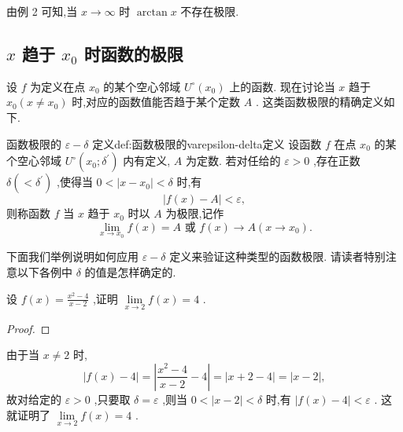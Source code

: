 \begin{remark}
由例 2 可知,当 \(x \rightarrow  \infty\) 时 \(\arctan x\) 不存在极限.
\end{remark}


\subsection{\(x\) 趋于 \({x}_{0}\) 时函数的极限}

设 \(f\) 为定义在点 \({x}_{0}\) 的某个空心邻域 \({U}^{ \circ  }\left( {x}_{0}\right)\) 上的函数. 现在讨论当 \(x\) 趋于 \({x}_{0}\left( {x \neq  {x}_{0}}\right)\) 时,对应的函数值能否趋于某个定数 \(A\) . 这类函数极限的精确定义如下.

\begin{definition}{函数极限的 \(\varepsilon  - \delta\) 定义}{def:函数极限的varepsilon-delta定义}
设函数 \(f\) 在点 \({x}_{0}\) 的某个空心邻域 \({U}^{ \circ  }\left( {{x}_{0};{\delta }^{\prime }}\right)\) 内有定义, \(A\) 为定数. 若对任给的 \(\varepsilon  > 0\) ,存在正数 \(\delta \left( { < {\delta }^{\prime }}\right)\) ,使得当 \(0 < \left| {x - {x}_{0}}\right|  < \delta\) 时,有
\[
\left| {f\left( x\right)  - A}\right|  < \varepsilon ,
\]
则称函数 \(f\) 当 \(x\) 趋于 \({x}_{0}\) 时以 \(A\) 为极限,记作
\[
\mathop{\lim }\limits_{{x \rightarrow  {x}_{0}}}f\left( x\right)  = A\text{ 或 }f\left( x\right)  \rightarrow  A\left( {x \rightarrow  {x}_{0}}\right) .
\]
\end{definition}

下面我们举例说明如何应用 \(\varepsilon  - \delta\) 定义来验证这种类型的函数极限. 请读者特别注意以下各例中 \(\delta\) 的值是怎样确定的.

\begin{example}

\end{example}
设 \(f\left( x\right)  = \frac{{x}^{2} - 4}{x - 2}\) ,证明 \(\mathop{\lim }\limits_{{x \rightarrow  2}}f\left( x\right)  = 4\) .

\begin{proof}

\end{proof}
由于当 \(x \neq  2\) 时,
\[
\left| {f\left( x\right)  - 4}\right|  = \left| {\frac{{x}^{2} - 4}{x - 2} - 4}\right|  = \left| {x + 2 - 4}\right|  = \left| {x - 2}\right| ,
\]
故对给定的 \(\varepsilon  > 0\) ,只要取 \(\delta  = \varepsilon\) ,则当 \(0 < \left| {x - 2}\right|  < \delta\) 时,有 \(\left| {f\left( x\right)  - 4}\right|  < \varepsilon\) . 这就证明了 \(\mathop{\lim }\limits_{{x \rightarrow  2}}f\left( x\right)  = 4\) .

